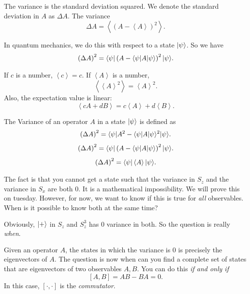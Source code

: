 The variance is the standard deviation squared. We denote the standard deviation in $A$ as $\Delta A$. The variance
\[
	\Delta A=\left\langle \left( A-\left\langle A \right\rangle  \right) ^2 \right\rangle 
.\]

In quantum mechanics, we do this with respect to a state $\lvert\psi \rangle $. So we have
\[
	\left( \Delta A \right) ^2 = \langle\psi \rvert \left( A-\langle\psi \rvert A\lvert\psi \rangle  \right) ^2 \lvert\psi \rangle 
.\]

If $c$ is a number, $\left\langle c \right\rangle =c$. If $\left\langle A \right\rangle $ is a number,
\[
	\left\langle \left\langle A \right\rangle ^2 \right\rangle =\left\langle A \right\rangle ^2
.\]
Also, the expectation value is linear:
\[
	\left\langle cA+dB \right\rangle =c\left\langle A \right\rangle +d\left\langle B \right\rangle 
.\]
\begin{definition}[Variance]\label{dfn:V}
	The Variance of an operator $A$ in a state $\lvert\psi \rangle $ is defined as
	\[
		\left( \Delta A \right) ^2 = \langle\psi \rvert A^2-\langle\psi \rvert A \lvert\psi \rangle^2 \lvert\psi \rangle
	.\]
	\[
		\left( \Delta A \right) ^2=\langle\psi \rvert \left( A-\langle\psi \rvert A\lvert\psi \rangle  \right) ^2\lvert\psi \rangle
	.\]
	\[
		\left( \Delta A \right) ^2=\langle\psi \rvert \left\langle A \right\rangle \lvert\psi \rangle
	.\]
\end{definition}

The fact is that you cannot get a state such that the variance in $S_z$ and the variance in $S_x$ are both 0. It is a mathematical impossibility. We will prove this on tuesday. However, for now, we want to know if this is true for \emph{all} observables. When is it possible to know both at the same time?

Obviously, $\lvert+\rangle $ in $S_z$ and $S_z^3$ has 0 variance in both. So the question is really \emph{when}.

Given an operator $A$, the states in which the variance is 0 is precisely the eigenvectors of $A$. The question is now when can you find a complete set of states that are eigenvectors of two observables $A,B$. You can do this \emph{if and only if}
\[
	[A,B]=AB-BA=0
.\]
In this case, $[\cdot ,\cdot ]$ is the \emph{commutator}.
